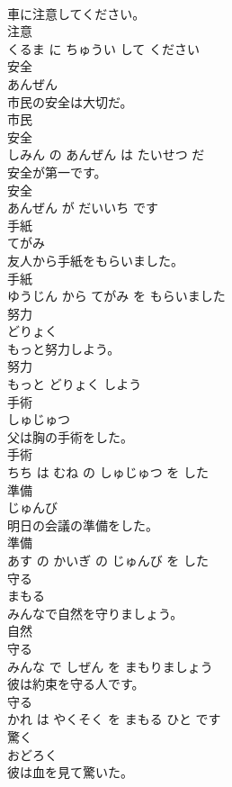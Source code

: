 \documentclass[8pt]{extreport}
\begin{document}
\begin{CJK}{UTF8}{min}
\\	車に注意してください。	
\\	注意 
\\	くるま に ちゅうい して ください			
\\	安全	
\\	あんぜん			
\\	市民の安全は大切だ。	
\\	市民 
\\	安全 
\\	しみん の あんぜん は たいせつ だ			
\\	安全が第一です。	
\\	安全 
\\	あんぜん が だいいち です			
\\	手紙	
\\	てがみ			
\\	友人から手紙をもらいました。	
\\	手紙 
\\	ゆうじん から てがみ を もらいました			
\\	努力	
\\	どりょく			
\\	もっと努力しよう。	
\\	努力 
\\	もっと どりょく しよう			
\\	手術	
\\	しゅじゅつ			
\\	父は胸の手術をした。	
\\	手術 
\\	ちち は むね の しゅじゅつ を した			
\\	準備	
\\	じゅんび			
\\	明日の会議の準備をした。	
\\	準備 
\\	あす の かいぎ の じゅんび を した			
\\	守る	
\\	まもる			
\\	みんなで自然を守りましょう。	
\\	自然 
\\	守る 
\\	みんな で しぜん を まもりましょう			
\\	彼は約束を守る人です。	
\\	守る 
\\	かれ は やくそく を まもる ひと です			
\\	驚く	
\\	おどろく			
\\	彼は血を見て驚いた。	

\end{CJK}
\end{document}

